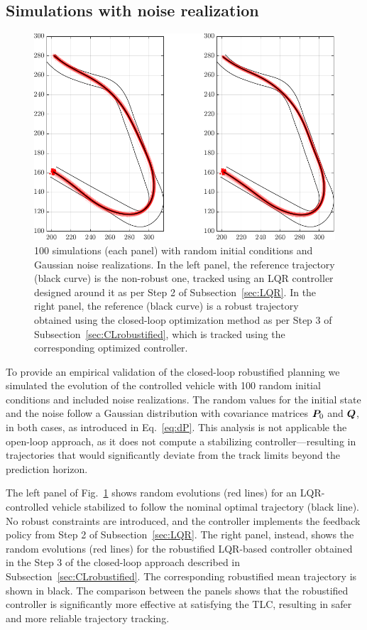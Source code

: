 \subsection{Simulations with noise realization}
\begin{figure}[t!]
	\centering
	\includegraphics{Fig/olcl_traj_strings.pdf}
	\caption{100 simulations (each panel) with random initial conditions and Gaussian noise realizations. In the left panel, the reference trajectory (black curve) is the non-robust one, tracked using an LQR controller designed around it as per Step 2 of Subsection~\ref{sec:LQR}. In the right panel, the reference (black curve) is a robust trajectory obtained using the closed-loop optimization method as per Step 3 of Subsection~\ref{sec:CLrobustified}, which is tracked using the corresponding optimized controller.}
	\label{fig:traj_strings}
\end{figure}
To provide an empirical validation of the closed-loop robustified planning we simulated the evolution of the controlled vehicle with 100 random initial conditions and included noise realizations. The random values for the initial state and the noise follow a Gaussian distribution with covariance matrices $\boldsymbol{P}_0$ and $\boldsymbol{Q}$, in both cases, as introduced in Eq.~\eqref{eq:dP}. This analysis is not applicable the open-loop approach, as it does not compute a stabilizing controller---resulting in trajectories that would significantly deviate from the track limits beyond the prediction horizon.


The left panel of Fig.~\ref{fig:traj_strings} shows random evolutions (red lines) for an LQR-controlled vehicle stabilized to follow the nominal optimal trajectory (black line). No robust constraints are introduced, and the controller implements the feedback policy from Step 2 of Subsection~\ref{sec:LQR}. The right panel, instead, shows the random evolutions (red lines) for the robustified LQR-based controller obtained in the Step 3 of the closed-loop approach described in Subsection~\ref{sec:CLrobustified}. The corresponding robustified mean trajectory is shown in black.
The comparison between the panels shows that the robustified controller is significantly more effective at satisfying the TLC, resulting in safer and more reliable trajectory tracking.

